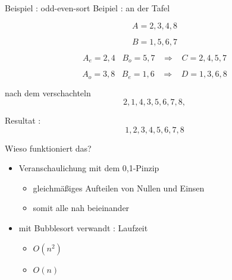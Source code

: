 \documentclass[ucs,9pt]{beamer}
\begin{document}
\begin{frame}{Beispiel : odd-even-sort}
Beipiel : an der Tafel\\
\begin{itemize}
\item[] $$ A = 2,3,4,8 $$
\item[] $$ B = 1,5,6,7 $$
 {\item[] $$ A_e = 2,4 \;\;\; B_o = 5,7 \;\;\; \Rightarrow \;\;\; C= 2,4,5,7 $$}
 {\item[] $$ A_o = 3,8 \;\;\; B_e = 1,6 \;\;\; \Rightarrow \;\;\; D = 1,3,6,8 $$}
 {\item[] nach dem verschachteln $$ 2,1,4,3,5,6,7,8,$$}
 {\item[] Resultat : $$1,2,3,4,5,6,7,8$$}
\end{itemize}
\end{frame}

\begin{frame}{Wieso funktioniert das?}
\begin{itemize}
\item Veranschaulichung mit dem 0,1-Pinzip
	\begin{itemize}
		\item gleichmäßiges Aufteilen von Nullen und Einsen
		\item somit alle nah beieinander
	\end{itemize}
\item mit Bubblesort verwandt : Laufzeit \\
\begin{itemize}
\item[worst : ] $O(n^2)$
\item[best  : ] $O(n)$
\end{itemize}
\end{itemize}
\end{frame}
\end{document}
